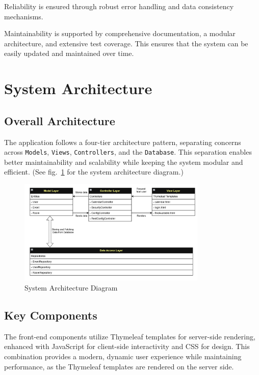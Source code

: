Reliability is ensured through robust error handling and data consistency mechanisms.

Maintainability is supported by comprehensive documentation, a modular architecture, and extensive test coverage.
This ensures that the system can be easily updated and maintained over time.


\section{System Architecture}\label{sec:system-architecture}

\subsection{Overall Architecture}\label{subsec:overall-architecture}
The application follows a four-tier architecture pattern, separating concerns across \texttt{Models}, \texttt{Views}, \texttt{Controllers}, and the \texttt{Database}.
This separation enables better maintainability and scalability while keeping the system modular and efficient.
(See fig.~\ref{fig:architecture} for the system architecture diagram.)

\begin{figure}[h]
    \centering
    \includegraphics[width=0.8\textwidth]{MVCSchema}
    \caption{System Architecture Diagram}
    \label{fig:architecture}
\end{figure}

\subsection{Key Components}\label{subsec:key-components}

The front-end components utilize Thymeleaf templates for server-side rendering, enhanced with JavaScript for client-side interactivity and CSS for design.
This combination provides a modern, dynamic user experience while maintaining performance, as the Thymeleaf templates are rendered on the server side.

